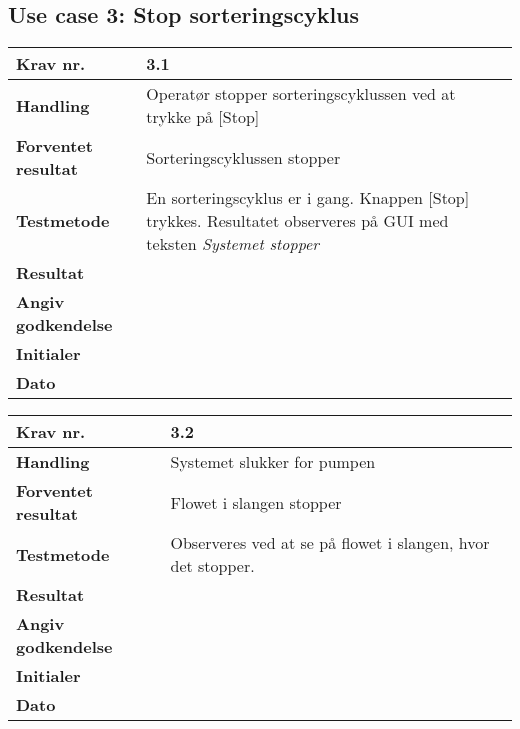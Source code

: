 \newpage
  \subsection{Use case 3: Stop sorteringscyklus}

	\begin{center}
		\begin{longtable}{ | m{4cm}| m{8.5cm}|} 
			\hline
			\textbf{Krav nr.} & 3.1  \\ 
			\hline
			\textbf{Handling} & Operatør stopper sorteringscyklussen ved at trykke på [Stop] \\
			\hline
			\textbf{Forventet resultat} & Sorteringscyklussen stopper \\
			\hline
			\textbf{Testmetode}  &En sorteringscyklus er i gang. Knappen [Stop] trykkes. Resultatet observeres på GUI med teksten \textit{Systemet stopper} \\
			\hline
			\textbf{Resultat}  &    \\
			\hline
			\textbf{Angiv godkendelse} &     \\
			\hline
			\textbf{Initialer} &     \\
			\hline
			\textbf{Dato} &    \\
			\hline
		\end{longtable}
	\end{center}
			
	\begin{center}
		\begin{longtable}{ | m{4cm}| m{8.5cm}|} 
			\hline
			\textbf{Krav nr.} & 3.2  \\ 
			\hline
			\textbf{Handling} & Systemet slukker for pumpen \\
			\hline
			\textbf{Forventet resultat} & Flowet i slangen stopper \\
			\hline
			\textbf{Testmetode}  & Observeres ved at se på flowet i slangen, hvor det stopper.  \\
			\hline
			\textbf{Resultat}  &    \\
			\hline
			\textbf{Angiv godkendelse} &     \\
			\hline
			\textbf{Initialer} &     \\
			\hline
			\textbf{Dato} &    \\
			\hline
		\end{longtable}
	\end{center}
			
